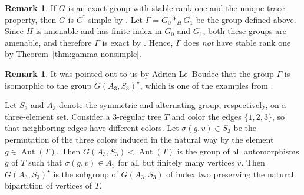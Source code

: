 \documentclass[a4paper]{amsart}
\theoremstyle{plain}
\theoremstyle{definition}
\newtheorem{remark}[theorem]{Remark}
\theoremstyle{remark}
\numberwithin{theorem}{section}
\begin{document}
\begin{remark}
If $G$ is an exact group with stable rank one and the unique trace property,
then $G$ is $C^*$-simple by \cite[Theorem~2.1]{B-O}.
Let $\Gamma=G_0*_H G_1$ be the group defined above.
Since $H$ is amenable and has finite index in $G_0$ and $G_1$, both these groups are amenable,
and therefore $\Gamma$ is exact by \cite[Corollary~3.3]{Dykema}.
Hence, $\Gamma$ does \emph{not} have stable rank one by Theorem~\ref{thm:gamma-nonsimple}.
\end{remark}

\begin{remark}\label{rmkGamma}
It was pointed out to us by Adrien Le~Boudec that the group $\Gamma$ is isomorphic to the group $G(A_3,S_3)^{\star}$,
which is one of the examples from \cite[Section~5]{Boudec}.

Let $S_3$ and $A_3$ denote the symmetric and alternating group, respectively, on a three-element set.
Consider a $3$-regular tree $T$ and color the edges $\{1,2,3\}$, so that neighboring edges have different colors.
Let $\sigma(g,v) \in S_3$ be the permutation of the three colors induced in the natural way by the element $g\in\operatorname{Aut}(T)$.
Then $G(A_3,S_3) < \operatorname{Aut}(T)$ is the group of all automorphisms $g$ of $T$ such that $\sigma(g,v) \in A_3$ for all but finitely many vertices $v$.
Then $G(A_3,S_3)^{\star}$ is the subgroup of $G(A_3,S_3)$ of index two preserving the natural bipartition of vertices of $T$.


\end{remark}
\end{document}
